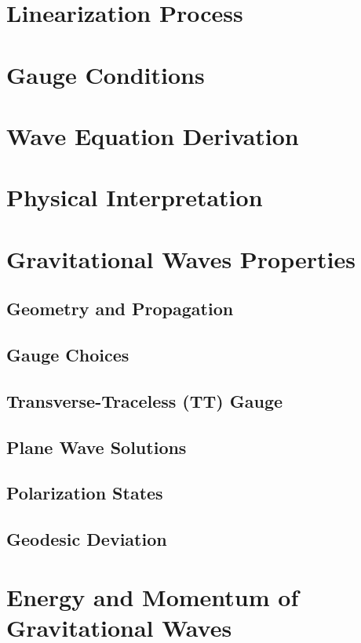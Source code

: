 \section{Linearization Process}\label{sec:linearization-process}
\section{Gauge Conditions}\label{sec:gauge-conditions}
\section{Wave Equation Derivation}\label{sec:wave-equation-derivation}
\section{Physical Interpretation}\label{sec:physical-interpretation}
\section{Gravitational Waves Properties}\label{sec:gravitational-waves-properties}
\subsection{Geometry and Propagation}\label{subsec:geometry-and-propagation}
\subsection{Gauge Choices}\label{subsec:gauge-choices}
\subsection{Transverse-Traceless (TT) Gauge}\label{subsec:transverse-traceless-tt-gauge}
\subsection{Plane Wave Solutions}\label{subsec:plane-wave-solutions}
\subsection{Polarization States}\label{subsec:polarization-states}
\subsection{Geodesic Deviation}\label{subsec:geodesic-deviation}
\section{Energy and Momentum of Gravitational Waves}\label{sec:energy-and-momentum-of-gravitational-waves}

